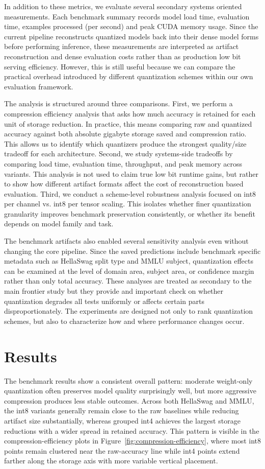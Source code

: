 \documentclass[11pt,twocolumn]{article}
\begin{document}
In addition to these metrics, we evaluate several secondary systems oriented measurements. Each benchmark summary records model load time, evaluation time, examples processed (per second) and peak CUDA memory usage. Since the current pipeline reconstructs quantized models back into their dense model forms before performing inference, these measurements are interpreted as artifact reconstruction and dense evaluation costs rather than as production low bit serving efficiency. However, this is still useful because we can compare the practical overhead introduced by different quantization schemes within our own evaluation framework. 

The analysis is structured around three comparisons. First, we perform a compression efficiency analysis that asks how much accuracy is retained for each unit of storage reduction. In practice, this means comparing raw and quantized accuracy against both absolute gigabyte storage saved and compression ratio. This allows us to identify which quantizers produce the strongest quality/size tradeoff for each architecture. Second, we study systems-side tradeoffs by comparing load time, evaluation time, throughput, and peak memory across variants. This analysis is not used to claim true low bit runtime gains, but rather to show how different artifact formats affect the cost of reconstruction based evaluation. Third, we conduct a scheme-level robustness analysis focused on int8 per channel vs. int8 per tensor scaling. This isolates whether finer quantization granularity improves benchmark preservation consistently, or whether its benefit depends on model family and task.

The benchmark artifacts also enabled several sensitivity analysis even without changing the core pipeline. Since the saved predictions include benchmark specific metadata such as HellaSwag split type and MMLU subject, quantization effects can be examined at the level of domain area, subject area, or confidence margin rather than only total accuracy. These analyses are treated as secondary to the main frontier study but they provide and important check on whether quantization degrades all tests uniformly or affects certain parts disproportionately. The experiments are designed not only to rank quantization schemes, but also to characterize how and where performance changes occur.  

\section{Results}
The benchmark results show a consistent overall pattern: moderate weight-only quantization often preserves model quality surprisingly well, but more aggressive compression produces less stable outcomes. Across both HellaSwag and MMLU, the int8 variants generally remain close to the raw baselines while reducing artifact size substantially, whereas grouped int4 achieves the largest storage reductions with a wider spread in retained accuracy. This pattern is visible in the compression-efficiency plots in Figure~\ref{fig:compression-efficiency}, where most int8 points remain clustered near the raw-accuracy line while int4 points extend farther along the storage axis with more variable vertical placement.
\end{document}
